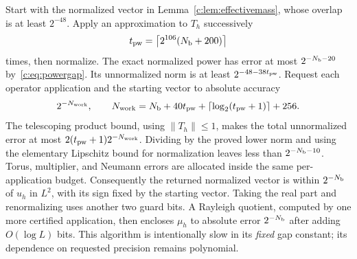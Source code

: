 Start with the normalized vector in Lemma~\ref{c:lem:effectivemass},
whose overlap is at least $2^{-48}$. Apply an approximation to
$T_h$ successively
\begin{equation}
 t_{\rm pw}=\left\lceil2^{106}(N_{\rm b}+200)\right\rceil            \label{c:eq:powersteps}
\end{equation}
times, then normalize. The exact normalized power has error at most
$2^{-N_{\rm b}-20}$ by~\eqref{c:eq:powergap}. Its unnormalized norm is at
least $2^{-48-38t_{\rm pw}}$. Request each operator application and the
starting vector to absolute accuracy
\begin{equation}
 2^{-N_{\rm work}},\qquad
 N_{\rm work}=N_{\rm b}+40t_{\rm pw}+\lceil\log_2(t_{\rm pw}+1)\rceil+256.
                                                               \label{c:eq:workbits}
\end{equation}
The telescoping product bound, using $\|T_h\|\le1$, makes the total
unnormalized error at most
$2(t_{\rm pw}+1)2^{-N_{\rm work}}$. Dividing by the proved lower norm and
using the elementary Lipschitz bound for normalization leaves less
than $2^{-N_{\rm b}-10}$. Torus, multiplier, and Neumann errors are allocated
inside the same per-application budget. Consequently the returned
normalized vector is within $2^{-N_{\rm b}}$ of $u_h$ in $L^2$, with its
sign fixed by the starting vector. Taking the real part and
renormalizing uses another two guard bits. A Rayleigh quotient,
computed by one more certified application, then encloses $\mu_h$
to absolute error $2^{-N_{\rm b}}$ after adding $O(\log L)$ bits.
This algorithm is intentionally slow in its \emph{fixed} gap constant;
its dependence on requested precision remains polynomial.

